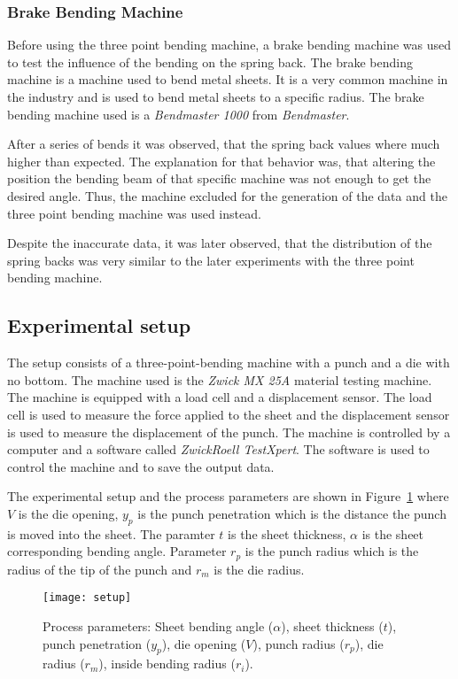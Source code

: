 \subsubsection{Brake Bending Machine}
Before using the three point bending machine, a brake bending machine was used to test the influence of the bending
on the spring back. The brake bending machine is a machine used to bend metal sheets. It is a very common machine in
the industry and is used to bend metal sheets to a specific radius. The brake bending machine used is a
\textit{Bendmaster 1000} from \textit{Bendmaster}.

After a series of bends it was observed, that the spring back values where much higher than expected. The explanation
for that behavior was, that altering the position the bending beam of that specific machine was not enough to get the
desired angle. Thus, the machine excluded for the generation of the data and the three point bending machine was used
instead.

Despite the inaccurate data, it was later observed, that the distribution of the spring backs was very similar to the
later experiments with the three point bending machine.

\subsection{Experimental setup}
The setup consists of a three-point-bending machine with a punch and a die with no bottom. The machine used is the
\textit{Zwick MX 25A} material testing machine.
The machine is equipped with a load cell and a displacement sensor. The load cell is used to measure the force
applied to the sheet and the displacement sensor is used to measure the displacement of the punch.
The machine is controlled by a computer and a software called \textit{ZwickRoell TestXpert}. The software is used to
control the machine and to save the output data.

The experimental setup and the process parameters are shown in Figure~\ref{fig:setup} where $V$ is the die opening,
$y_p$ is the punch penetration which is the distance the punch is moved into the sheet.
The paramter $t$ is the sheet thickness,  $\alpha$ is the sheet corresponding bending angle. Parameter $r_p$ is the
punch radius which is the radius of the tip of the punch and $r_m$ is the die radius.


\begin{figure}[H]
    \centering
    \texttt{[image: setup]}
    \caption{Process parameters: Sheet bending angle ($\alpha$), sheet thickness ($t$), punch penetration ($y_p$),
        die opening ($V$), punch radius ($r_p$), die radius ($r_m$), inside bending radius ($r_i$).}
    \label{fig:setup}
\end{figure}

